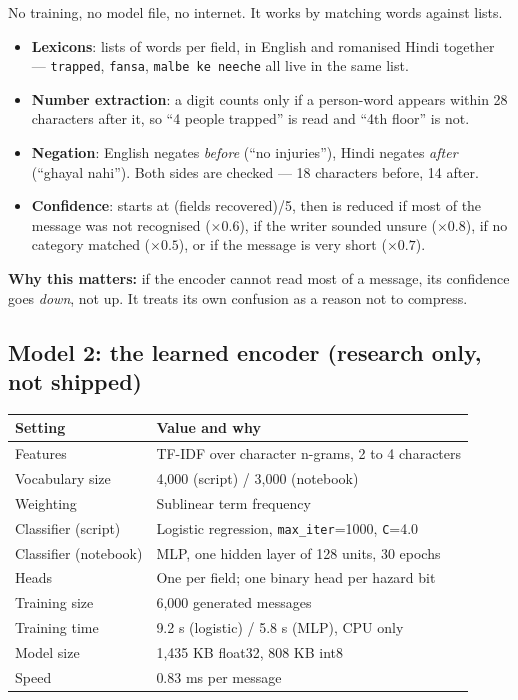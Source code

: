 \documentclass[11pt,a4paper]{article}
\begin{document}
No training, no model file, no internet. It works by matching words against
lists.

\begin{itemize}
\item \textbf{Lexicons}: lists of words per field, in English and romanised
      Hindi together --- \texttt{trapped}, \texttt{fansa}, \texttt{malbe ke
      neeche} all live in the same list.
\item \textbf{Number extraction}: a digit counts only if a person-word appears
      within 28 characters after it, so ``4 people trapped'' is read and
      ``4th floor'' is not.
\item \textbf{Negation}: English negates \emph{before} (``no injuries''),
      Hindi negates \emph{after} (``ghayal nahi''). Both sides are checked ---
      18 characters before, 14 after.
\item \textbf{Confidence}: starts at (fields recovered)/5, then is reduced if
      most of the message was not recognised ($\times 0.6$), if the writer
      sounded unsure ($\times 0.8$), if no category matched ($\times 0.5$), or
      if the message is very short ($\times 0.7$).
\end{itemize}

\textbf{Why this matters:} if the encoder cannot read most of a message, its
confidence goes \emph{down}, not up. It treats its own confusion as a reason
not to compress.

\subsection{Model 2: the learned encoder (research only, not shipped)}

\begin{center}
\begin{tabular}{l p{9.5cm}}
\toprule
\textbf{Setting} & \textbf{Value and why} \\
\midrule
Features & TF-IDF over character n-grams, 2 to 4 characters \\
Vocabulary size & 4{,}000 (script) / 3{,}000 (notebook) \\
Weighting & Sublinear term frequency \\
Classifier (script) & Logistic regression, \texttt{max\_iter}=1000, \texttt{C}=4.0 \\
Classifier (notebook) & MLP, one hidden layer of 128 units, 30 epochs \\
Heads & One per field; one binary head per hazard bit \\
Training size & 6{,}000 generated messages \\
Training time & 9.2 s (logistic) / 5.8 s (MLP), CPU only \\
Model size & 1{,}435 KB float32, 808 KB int8 \\
Speed & 0.83 ms per message \\
\bottomrule
\end{tabular}
\end{center}
\end{document}
